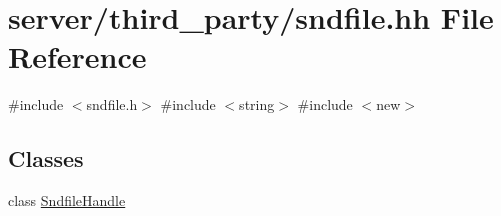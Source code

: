 \hypertarget{sndfile_8hh}{}\section{server/third\+\_\+party/sndfile.hh File Reference}
\label{sndfile_8hh}
{\ttfamily \#include $<$sndfile.\+h$>$}\newline
{\ttfamily \#include $<$string$>$}\newline
{\ttfamily \#include $<$new$>$}\newline
\subsection*{Classes}
\begin{DoxyCompactItemize}
\item 
class \mbox{\hyperlink{class_sndfile_handle}{Sndfile\+Handle}}
\end{DoxyCompactItemize}
